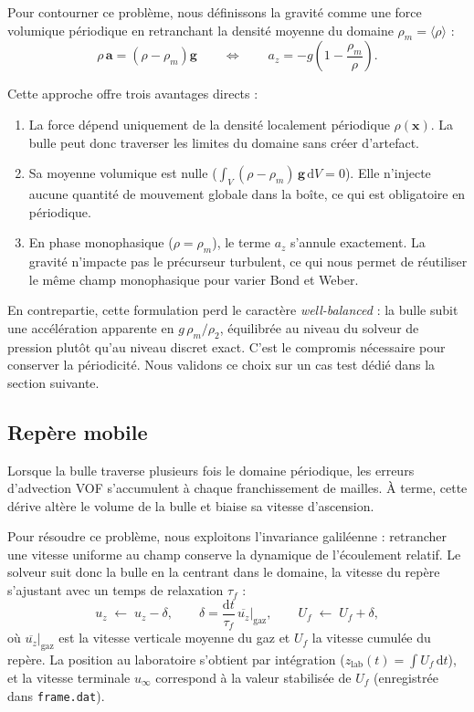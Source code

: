 Pour contourner ce problème, nous définissons la gravité comme une force volumique périodique en retranchant la densité moyenne du domaine $\rho_m = \langle\rho\rangle$ :
\begin{equation}
    \rho\,\mathbf{a} = \left(\rho - \rho_m\right)\mathbf{g}
    \qquad\Longleftrightarrow\qquad
    a_z = -g\left(1 - \frac{\rho_m}{\rho}\right).
    \label{eq:force_perio}
\end{equation}

Cette approche offre trois avantages directs :
\begin{enumerate}
    \item La force dépend uniquement de la densité localement périodique $\rho(\mathbf{x})$. La bulle peut donc traverser les limites du domaine sans créer d'artefact.
    \item Sa moyenne volumique est nulle ($\int_V (\rho-\rho_m)\,\mathbf{g}\,\mathrm{d}V = 0$). Elle n'injecte aucune quantité de mouvement globale dans la boîte, ce qui est obligatoire en périodique.
    \item En phase monophasique ($\rho=\rho_m$), le terme $a_z$ s'annule exactement. La gravité n'impacte pas le précurseur turbulent, ce qui nous permet de réutiliser le même champ monophasique pour varier Bond et Weber.
\end{enumerate}

En contrepartie, cette formulation perd le caractère \emph{well-balanced} : la bulle subit une accélération apparente en $g\,\rho_m/\rho_2$, équilibrée au niveau du solveur de pression plutôt qu'au niveau discret exact. C'est le compromis nécessaire pour conserver la périodicité. Nous validons ce choix sur un cas test dédié dans la section suivante.

\subsection{Repère mobile}
\label{subsec:repere}

Lorsque la bulle traverse plusieurs fois le domaine périodique, les erreurs d'advection VOF s'accumulent à chaque franchissement de mailles. À terme, cette dérive altère le volume de la bulle et biaise sa vitesse d'ascension.

Pour résoudre ce problème, nous exploitons l'invariance galiléenne : retrancher une vitesse uniforme au champ conserve la dynamique de l'écoulement relatif. Le solveur suit donc la bulle en la centrant dans le domaine, la vitesse du repère s'ajustant avec un temps de relaxation $\tau_f$ :
\begin{equation}
    u_z \;\leftarrow\; u_z - \delta, \qquad
    \delta = \frac{\mathrm{d}t}{\tau_f}\,\overline{u_z}\big|_{\text{gaz}},
    \qquad
    U_f \;\leftarrow\; U_f + \delta,
    \label{eq:repere_mobile}
\end{equation}
où $\overline{u_z}|_{\text{gaz}}$ est la vitesse verticale moyenne du gaz et $U_f$ la vitesse cumulée du repère. La position au laboratoire s'obtient par intégration ($z_{\text{lab}}(t) = \int U_f\,\mathrm{d}t$), et la vitesse terminale $u_\infty$ correspond à la valeur stabilisée de $U_f$ (enregistrée dans \texttt{frame.dat}).

